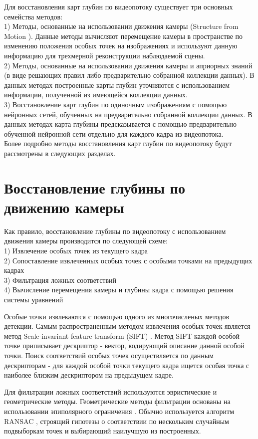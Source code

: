 \documentclass{mipt-thesis-bs}
\begin{document}
Для восстановления карт глубин по видеопотоку существует три основных семейства методов:\\
1) Методы, основанные на использовании движения камеры (Structure from Motion \cite{koenderink1991affine}). Данные методы вычисляют перемещение камеры в пространстве по изменению положения особых точек на изображениях и используют данную информацию для трехмерной реконструкции наблюдаемой сцены.\\
2) Методы, основанные на использовании движения камеры и априорных знаний (в виде решающих правил либо предварительно собранной коллекции данных). В данных методах построенные карты глубин уточняются с использованием информации, полученной из имеющейся коллекции данных.\\
3) Восстановление карт глубин по одиночным изображениям с помощью нейронных сетей, обученных на предварительно собранной коллекции данных. В данных методах карта глубины предсказывается с помощью предварительно обученной нейронной сети отдельно для каждого кадра из видеопотока.\\
Более подробно методы восстановления карт глубин по видеопотоку будут рассмотрены в следующих разделах.

\section{Восстановление глубины по движению камеры}
Как правило, восстановление глубины по видеопотоку с использованием движения камеры производится по следующей схеме:\\
1) Извлечение особых точек из текущего кадра\\
2) Сопоставление извлеченных особых точек с особыми точками на предыдущих кадрах\\
3) Фильтрация ложных соответствий\\
4) Вычисление перемещения камеры и глубины кадра с помощью решения системы уравнений

Особые точки извлекаются с помощью одного из многочисленых методов детекции. Самым распространенным методом извлечения особых точек является метод Scale-invariant feature transform (SIFT) \cite{lowe1999object}. Метод SIFT каждой особой точке приписывает дескриптор - вектор, кодирующий описание данной особой точки. Поиск соответствий особых точек осуществляется по данным дескрипторам - для каждой особой точки текущего кадра ищется особая точка с наиболее близким дескриптором на предыдущем кадре.

Для фильтрации ложных соответствий используются эвристические и геометрические методы. Геометрические методы фильтрации основаны на использовании эпиполярного ограничения \cite{diel2005epipolar}. Обычно используется алгоритм RANSAC \cite{brachmann2017dsac}, строящий гипотезы о соответствии по нескольким случайным подвыборкам точек и выбирающий наилучшую из построенных.
\end{document}

